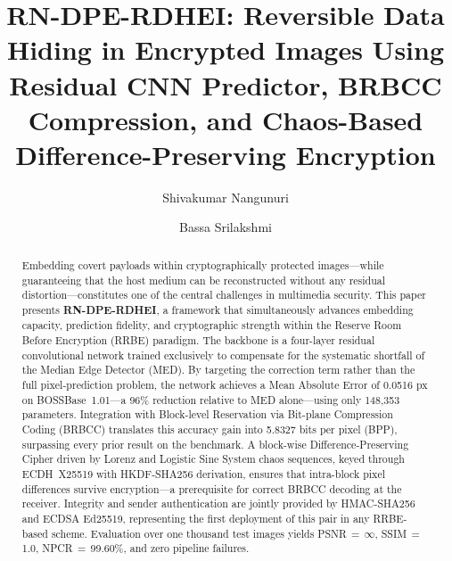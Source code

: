 \documentclass[runningheads]{llncs}
\begin{document}
\title{RN-DPE-RDHEI: Reversible Data Hiding in Encrypted
Images Using Residual CNN Predictor, BRBCC Compression,
and Chaos-Based Difference-Preserving Encryption}


\author{
    Shivakumar Nangunuri \and
    Bassa Srilakshmi
}



\maketitle

\begin{abstract}
Embedding covert payloads within cryptographically protected
images—while guaranteeing that the host medium can be
reconstructed without any residual distortion—constitutes
one of the central challenges in multimedia security.
This paper presents \textbf{RN-DPE-RDHEI}, a framework that
simultaneously advances embedding capacity, prediction
fidelity, and cryptographic strength within the Reserve
Room Before Encryption (RRBE) paradigm. The backbone is a
four-layer residual convolutional network trained exclusively
to compensate for the systematic shortfall of the Median
Edge Detector (MED). By targeting the correction term rather
than the full pixel-prediction problem, the network achieves
a Mean Absolute Error of 0.0516 px on BOSSBase~1.01---a
96\% reduction relative to MED alone---using only 148,353
parameters. Integration with Block-level Reservation via
Bit-plane Compression Coding (BRBCC) translates this
accuracy gain into 5.8327 bits per pixel (BPP), surpassing
every prior result on the benchmark. A block-wise
Difference-Preserving Cipher driven by Lorenz and Logistic
Sine System chaos sequences, keyed through ECDH~X25519 with
HKDF-SHA256 derivation, ensures that intra-block pixel
differences survive encryption---a prerequisite for correct
BRBCC decoding at the receiver. Integrity and sender
authentication are jointly provided by HMAC-SHA256 and ECDSA
Ed25519, representing the first deployment of this pair in
any RRBE-based scheme. Evaluation over one thousand test
images yields PSNR\,$=$\,$\infty$, SSIM\,$=$\,1.0,
NPCR\,$=$\,99.60\%, and zero pipeline failures.

\end{abstract}
\end{document}
